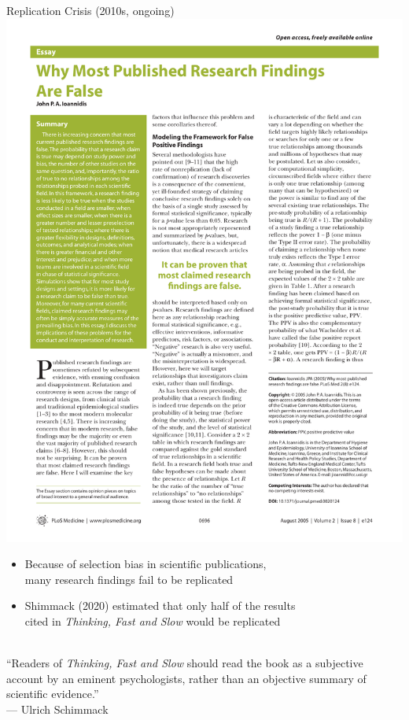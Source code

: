 \documentclass[handout]{beamer}
\begin{document}
  \begin{frame}{Replication Crisis (2010s, ongoing)}
    \includegraphics[width = \textwidth]{images/ioannidis.pdf}
    \begin{itemize}
      \item Because of selection bias in scientific publications,\\ many research findings fail to be replicated
      \item Shimmack (2020) estimated that only half of the results\\ cited in {\it Thinking, Fast and Slow} would be replicated
    \end{itemize}
    ~\\
    ``Readers of {\it Thinking, Fast and Slow} should read the book as a subjective account by an eminent psychologists, rather than an objective summary of scientific evidence.''\\
    \hfill--- Ulrich Schimmack
  \end{frame}
\end{document}
